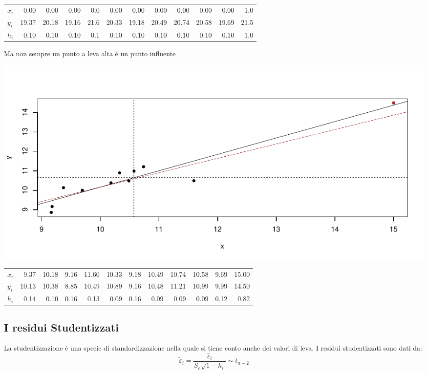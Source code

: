 \documentclass[
  11pt,
]{book}
\theoremstyle{mytheoremstyle}
\theoremstyle{mydefstyle}
\begin{document}
\begin{tabular}{lrrrrrrrrrr>{}r}
\toprule
$x_i$ & 0.00 & 0.00 & 0.00 & 0.0 & 0.00 & 0.00 & 0.00 & 0.00 & 0.00 & 0.00 & \textcolor[HTML]{AB292E}{1.0}\\
$y_i$ & 19.37 & 20.18 & 19.16 & 21.6 & 20.33 & 19.18 & 20.49 & 20.74 & 20.58 & 19.69 & \textcolor[HTML]{AB292E}{21.5}\\
$h_i$ & 0.10 & 0.10 & 0.10 & 0.1 & 0.10 & 0.10 & 0.10 & 0.10 & 0.10 & 0.10 & \textcolor[HTML]{AB292E}{1.0}\\
\bottomrule
\end{tabular}

Ma non sempre un punto a leva alta è un punto influente

\begin{center}\includegraphics{Appunti_di_Statistica_2025_files/figure-latex/18-regressione-II-26-1} \end{center}

\begin{tabular}{lrrrrrrrrrr>{}r}
\toprule
$x_i$ & 9.37 & 10.18 & 9.16 & 11.60 & 10.33 & 9.18 & 10.49 & 10.74 & 10.58 & 9.69 & \textcolor[HTML]{AB292E}{15.00}\\
$y_i$ & 10.13 & 10.38 & 8.85 & 10.49 & 10.89 & 9.16 & 10.48 & 11.21 & 10.99 & 9.99 & \textcolor[HTML]{AB292E}{14.50}\\
$h_i$ & 0.14 & 0.10 & 0.16 & 0.13 & 0.09 & 0.16 & 0.09 & 0.09 & 0.09 & 0.12 & \textcolor[HTML]{AB292E}{0.82}\\
\bottomrule
\end{tabular}

\subsection{I residui Studentizzati}\label{i-residui-studentizzati}

La studentizzazione è una specie di standardizzazione nella quale
si tiene conto anche dei valori di leva.
I residui studentizzati sono dati da:
\[
\tilde{\varepsilon}_{i}  =  \frac{\hat{\varepsilon}_{i}}{S_{\varepsilon} \sqrt{1 - h_{i}}} \sim t_{n-2}
\]
\end{document}
